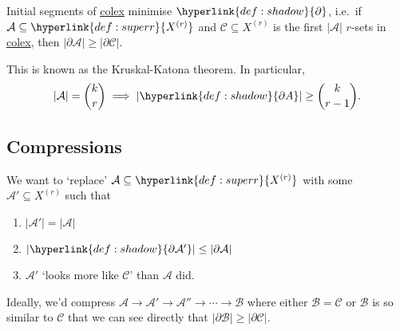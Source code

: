 \documentclass{article}
\let\subset\subseteq
\begin{document}
\begin{aim}
  Initial segments of \hyperlink{def:colex}{colex} minimise $\hyperlink{def:shadow}{\partial}$, i.e.\ if $\mathcal{A} \subset \hyperlink{def:superr}{X^{(r)}}$ and $\mathcal{C} \subset X^{(r)}$ is the first $|\mathcal{A}|$ $r$-sets in \hyperlink{def:colex}{colex}, then $|\partial \mathcal{A}| \geq |\partial \mathcal{C}|$.
\end{aim}
This is known as the Kruskal-Katona theorem.
In particular, \begin{equation*}|\mathcal{A}| = \binom{k}{r} \implies |\hyperlink{def:shadow}{\partial A}| \geq \binom{k}{r-1}.\end{equation*}

\subsection{Compressions}
\begin{idea}
We want to `replace' $\mathcal{A} \subset \hyperlink{def:superr}{X^{(r)}}$ with some $\mathcal{A}' \subset X^{(r)}$ such that
\begin{enumerate}[label=(\roman*)]
  \item $|\mathcal{A}'| = |\mathcal{A}|$
  \item $|\hyperlink{def:shadow}{\partial \mathcal{A}'}| \leq |\partial \mathcal{A}|$
  \item $\mathcal{A}'$ `looks more like $\mathcal{C}$' than $\mathcal{A}$ did.
\end{enumerate}
Ideally, we'd compress $\mathcal{A} \to \mathcal{A}' \to \mathcal{A}'' \to \dotsm \to \mathcal{B}$ where either $\mathcal{B} = \mathcal{C}$ or $\mathcal{B}$ is so similar to $\mathcal{C}$ that we can see directly that $|\partial \mathcal{B}| \geq |\partial \mathcal{C}|$.
\end{idea}
\end{document}
